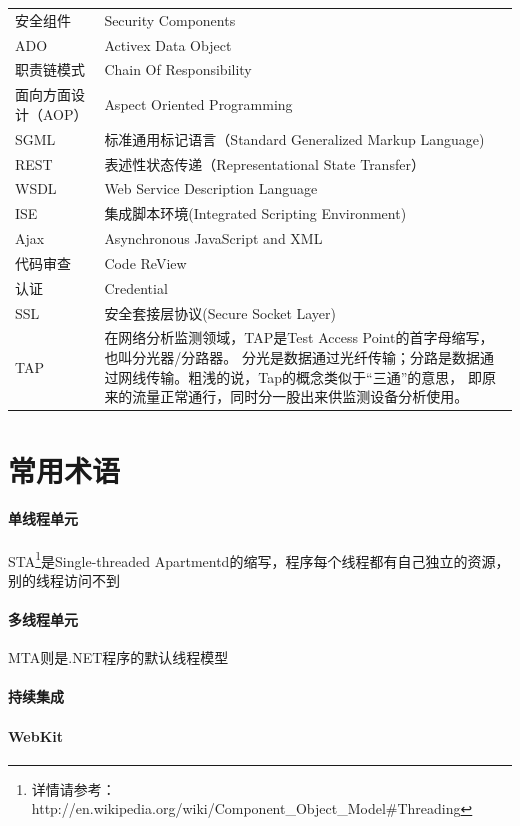\documentclass{book}
\begin{document}
\begin{longtable}{lp{10cm}}
	安全组件 & Security Components\\
	ADO & Activex Data Object\\
	职责链模式 & Chain Of Responsibility\\
	面向方面设计（AOP） & Aspect Oriented Programming\\
	SGML & 标准通用标记语言（Standard Generalized Markup Language)\\
	REST & 表述性状态传递（Representational State Transfer）\\
	WSDL & Web Service Description Language \\
	ISE & 集成脚本环境(Integrated Scripting Environment)\\
	Ajax & Asynchronous JavaScript and XML\\
	代码审查 & Code ReView\\
	认证 & Credential\\
	SSL & 安全套接层协议(Secure Socket Layer)\\
	TAP & 在网络分析监测领域，TAP是Test Access Point的首字母缩写，也叫分光器/分路器。
	分光是数据通过光纤传输；分路是数据通过网线传输。粗浅的说，Tap的概念类似于“三通”的意思，
	即原来的流量正常通行，同时分一股出来供监测设备分析使用。\\
\end{longtable}

\section{常用术语}

\paragraph{单线程单元}  STA\footnote{详情请参考：http://en.wikipedia.org/wiki/Component\_Object\_Model\#Threading}是Single-threaded Apartmentd的缩写，程序每个线程都有自己独立的资源，别的线程访问不到   


\paragraph{多线程单元}MTA则是.NET程序的默认线程模型   

\paragraph{持续集成}

\paragraph{WebKit}
\end{document}
